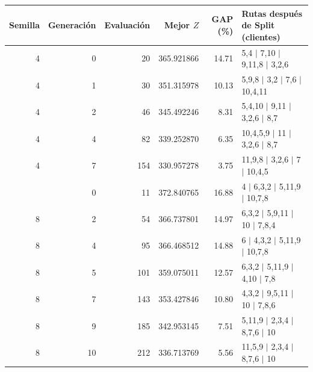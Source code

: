 \begin{tabular}{rrrrrl}\toprule
Semilla & Generación & Evaluación & Mejor $Z$ & GAP (\%) & Rutas después de Split (clientes)\\\midrule
4 & 0 & 20 & 365.921866 & 14.71 & 5,4 $|$ 7,10 $|$ 9,11,8 $|$ 3,2,6\\
4 & 1 & 30 & 351.315978 & 10.13 & 5,9,8 $|$ 3,2 $|$ 7,6 $|$ 10,4,11\\
4 & 2 & 46 & 345.492246 & 8.31 & 5,4,10 $|$ 9,11 $|$ 3,2,6 $|$ 8,7\\
4 & 4 & 82 & 339.252870 & 6.35 & 10,4,5,9 $|$ 11 $|$ 3,2,6 $|$ 8,7\\
4 & 7 & 154 & 330.957278 & 3.75 & 11,9,8 $|$ 3,2,6 $|$ 7 $|$ 10,4,5\\
\addlinespace
8 & 0 & 11 & 372.840765 & 16.88 & 4 $|$ 6,3,2 $|$ 5,11,9 $|$ 10,7,8\\
8 & 2 & 54 & 366.737801 & 14.97 & 6,3,2 $|$ 5,9,11 $|$ 10 $|$ 7,8,4\\
8 & 4 & 95 & 366.468512 & 14.88 & 6 $|$ 4,3,2 $|$ 5,11,9 $|$ 10,7,8\\
8 & 5 & 101 & 359.075011 & 12.57 & 6,3,2 $|$ 5,11,9 $|$ 4,10 $|$ 7,8\\
8 & 7 & 143 & 353.427846 & 10.80 & 4,3,2 $|$ 9,5,11 $|$ 10 $|$ 7,8,6\\
8 & 9 & 185 & 342.953145 & 7.51 & 5,11,9 $|$ 2,3,4 $|$ 8,7,6 $|$ 10\\
8 & 10 & 212 & 336.713769 & 5.56 & 11,5,9 $|$ 2,3,4 $|$ 8,7,6 $|$ 10\\
\bottomrule\end{tabular}

